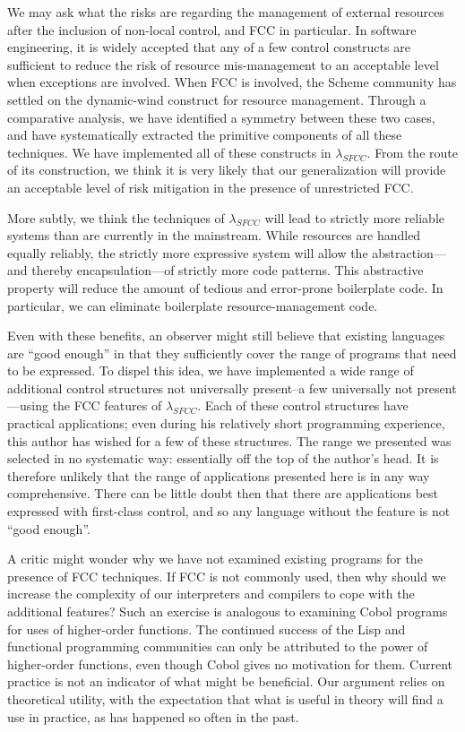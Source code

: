\documentclass[11pt]{article}
\begin{document}
We may ask what the risks are regarding the management of external resources after the inclusion of non-local control, and FCC in particular.
In software engineering, it is widely accepted that any of a few control constructs are sufficient to reduce the risk of resource mis-management to an acceptable level when exceptions are involved.
When FCC is involved, the Scheme community has settled on the dynamic-wind construct for resource management.
Through a comparative analysis, we have identified a symmetry between  these two cases, and have systematically extracted the primitive components of all these techniques.
We have implemented all of these constructs in $\lambda_{SFCC}$.
From the route of its construction, we think it is very likely that our generalization will provide an acceptable level of risk mitigation in the presence of unrestricted FCC.

More subtly, we think the techniques of $\lambda_{SFCC}$ will lead to strictly more reliable systems than are currently in the mainstream.
While resources are handled equally reliably, the strictly more expressive system will allow the abstraction---and thereby encapsulation---of strictly more code patterns.
This abstractive property will reduce the amount of tedious and error-prone boilerplate code.
In particular, we can eliminate boilerplate resource-management code.

Even with these benefits, an observer might still believe that existing languages are ``good enough'' in that they sufficiently cover the range of programs that need to be expressed.
To dispel this idea, we have implemented a wide range of additional control structures not universally present--a few universally not present---using the FCC features of $\lambda_{SFCC}$.
Each of these control structures have practical applications; even during his relatively short programming experience, this author has wished for a few of these structures.
The range we presented was selected in no systematic way: essentially off the top of the author's head.
It is therefore unlikely that the range of applications presented here is in any way comprehensive.
There can be little doubt then that there are applications best expressed with first-class control, and so any language without the feature is not ``good enough''.

A critic might wonder why we have not examined existing programs for the presence of FCC techniques.
If FCC is not commonly used, then why should we increase the complexity of our interpreters and compilers to cope with the additional features?
Such an exercise is analogous to examining Cobol programs for uses of higher-order functions.
The continued success of the Lisp and functional programming communities can only be attributed to the power of higher-order functions, even though Cobol gives no motivation for them.
Current practice is not an indicator of what might be beneficial.
Our argument relies on theoretical utility, with the expectation that what is useful in theory will find a use in practice, as has happened so often in the past.
\end{document}
